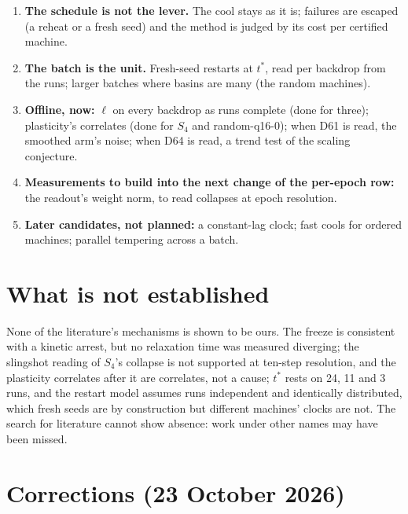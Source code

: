 \documentclass[11pt]{article}
\begin{document}
\begin{enumerate}
\item \textbf{The schedule is not the lever.} The cool stays as it is; failures are escaped (a reheat
or a fresh seed) and the method is judged by its cost per certified machine.
\item \textbf{The batch is the unit.} Fresh-seed restarts at $t^*$, read per backdrop from the runs;
larger batches where basins are many (the random machines).
\item \textbf{Offline, now:} $\ell$ on every backdrop as runs complete (done for three); plasticity's
correlates (done for $S_4$ and random-q16-0); when D61 is read, the smoothed arm's noise; when D64 is
read, a trend test of the scaling conjecture.
\item \textbf{Measurements to build into the next change of the per-epoch row:} the readout's weight
norm, to read collapses at epoch resolution.
\item \textbf{Later candidates, not planned:} a constant-lag clock; fast cools for ordered machines;
parallel tempering across a batch.
\end{enumerate}

\section{What is not established}

None of the literature's mechanisms is shown to be ours. The freeze is consistent with a kinetic
arrest, but no relaxation time was measured diverging; the slingshot reading of $S_4$'s collapse is
not supported at ten-step resolution, and the plasticity correlates after it are correlates, not a
cause; $t^*$ rests on 24, 11 and 3 runs, and the restart
model assumes runs independent and identically distributed, which fresh seeds are by construction
but different machines' clocks are not. The search for literature cannot show absence: work under
other names may have been missed.

\section{Corrections (23 October 2026)}
\label{sec:corrections}
\end{document}
